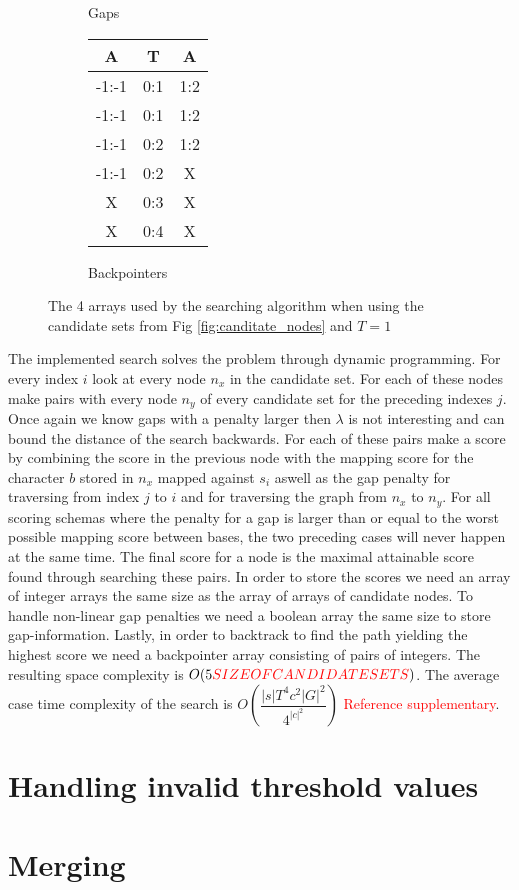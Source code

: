 \documentclass{article}
\begin{document}
\begin{wrapfigure}{l}{0.5\textwidth}
\begin{subfigure}[b]{0.49\textwidth}
    \caption{Gaps}
  \end{subfigure}
  \begin{subfigure}[b]{0.49\textwidth}
    \begin{center}
      \begin{tabular}{|c|c|c|}
        A & T & A \\ \hline 
        -1:-1 & 0:1 & 1:2 \\ \hline
        -1:-1 & 0:1 & 1:2 \\ \hline
        -1:-1 & 0:2 & 1:2 \\ \hline
        -1:-1 & 0:2 & X \\ \hline
        X & 0:3 & X \\ \hline
        X & 0:4 & X \\ \hline
      \end{tabular}
    \end{center}
    \caption{Backpointers}
  \end{subfigure}
  \caption{The 4 arrays used by the searching algorithm when using the candidate sets from Fig \ref{fig:canditate_nodes} and $T=1$}
  \label{fig:scoring_arrays}
\end{wrapfigure}
The implemented search solves the problem through dynamic programming. For every index $i$ look at every node $n_x$ in the candidate set. For each of these nodes make pairs with every node $n_y$ of every candidate set for the preceding indexes $j$. Once again we know gaps with a penalty larger then $\lambda$ is not interesting and can bound the distance of the search backwards. For each of these pairs make a score by combining the score in the previous node with the mapping score for the character $b$ stored in $n_x$ mapped against $s_i$ aswell as the gap penalty for traversing from index $j$ to $i$ and for traversing the graph from $n_x$ to $n_y$. For all scoring schemas where the penalty for a gap is larger than or equal to the worst possible mapping score between bases, the two preceding cases will never happen at the same time. The final score for a node is the maximal attainable score found through searching these pairs. In order to store the scores we need an array of integer arrays the same size as the array of arrays of candidate nodes. To handle non-linear gap penalties we need a boolean array the same size to store gap-information. Lastly, in order to backtrack to find the path yielding the highest score we need a backpointer array consisting of pairs of integers. The resulting space complexity is $O(5\textcolor{red}{SIZE OF CANDIDATE SETS})$. The average case time complexity of the search is $O(\dfrac{|s|T^4c^2|G|^2}{4^{|c|^2}})$ \textcolor{red}{Reference supplementary}.
\section{Handling invalid threshold values}
\section{Merging}
\end{document}
